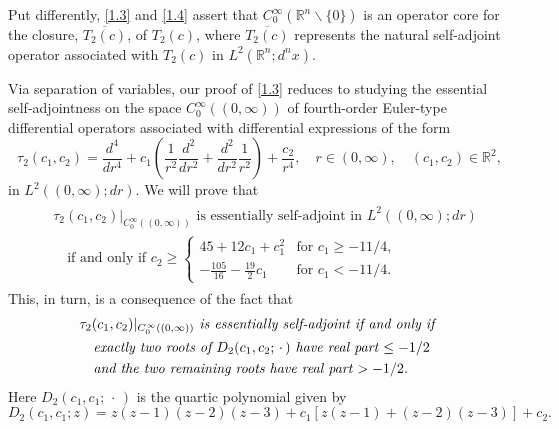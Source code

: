 \documentclass[reqno,11pt,centertags]{amsart}
\newcommand{\bbR}{{\mathbb{R}}}
\newcommand{\<}{\langle}
\renewcommand{\>}{\rangle}
\newcommand{\lb}{\label}
\newcommand{\ol}{\overline}
\newcommand{\dott}{\,\cdot\,}
\numberwithin{equation}{section}
\theoremstyle{definition}
\def\d{\displaystyle}
\begin{document}
Put differently, \eqref{1.3} and \eqref{1.4} assert that $C_0^{\infty}(\bbR^n \backslash \{0\})$ is an operator core for the closure, $\ol{T_2(c)}$, of $T_2(c)$, where $\ol{T_2(c)}$ represents the natural self-adjoint operator associated with $T_2(c)$ in $L^2(\bbR^n;d^nx)$. 

Via separation of variables, our proof of \eqref{1.3} reduces to studying the  
essential self-adjointness on the space $C_0^{\infty}((0,\infty))$ of fourth-order Euler-type differential operators associated with differential expressions  of the form 
\begin{equation}
\tau_2(c_1,c_2) = \frac{d^4}{dr^4} + c_1\left(\frac{1}{r^2}\frac{d^2}{dr^2} +\frac{d^2}{dr^2}\frac{1}{r^2}\right) + \frac{c_2}{r^4} , \quad r \in (0,\infty), \quad (c_1, c_2)\in \bbR^2,
\end{equation} 
in $L^2((0,\infty);dr)$. We will prove that 
\begin{align} \lb{1.5}
\begin{split} 
& \text{$\tau_2(c_1,c_2)|_{C_0^{\infty}((0,\infty))}$ is essentially self-adjoint in $L^2((0,\infty);dr)$} \\
& \quad \text{if and only if }
c_2\geq 
\begin{cases}
45 + 12c_1 + c_1^2 & \mbox{for $c_1 \geq   -11/4$},   \\[10pt]
{\d -\frac{105}{16}-\frac{19}{2} c_1}& \mbox{for $c_1 <   -11/4$}.
\end{cases}
\end{split} 
\end{align} 
This, in turn, is a consequence of the fact that 
\begin{align}
\begin{split} 
& \text{\it  $\tau_2(c_1,c_2)|_{C_0^{\infty}((0,\infty))}$ is essentially self-adjoint if and only if } \\
&  \quad \text{\it exactly two roots  of $D_2(c_1,c_2;\dott)$ have real part $\leq -1/2$}\\
& \quad \text{\it and the two remaining roots have real part $>-1/2$.}
\end{split} 
\end{align}
Here $D_2(c_1,c_1;\dott)$ is the quartic polynomial given by
\begin{equation}
D_2(c_1,c_1; z)=z(z-1)(z-2)(z-3) +c_1\left[z(z-1)+(z-2)(z-3)\right] +c_2. 
\end{equation}
\end{document}
